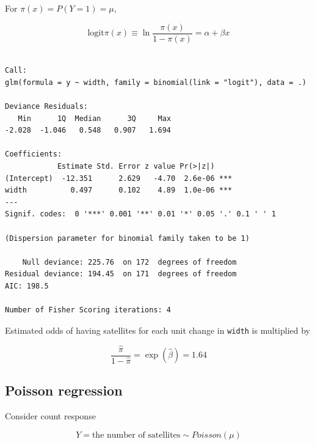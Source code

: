 \documentclass[]{book}
\newenvironment{Shaded}{\begin{snugshade}}{\end{snugshade}}
\newcommand{\DataTypeTok}[1]{\textcolor[rgb]{0.13,0.29,0.53}{#1}}
\newcommand{\KeywordTok}[1]{\textcolor[rgb]{0.13,0.29,0.53}{\textbf{#1}}}
\newcommand{\NormalTok}[1]{#1}
\newcommand{\OperatorTok}[1]{\textcolor[rgb]{0.81,0.36,0.00}{\textbf{#1}}}
\newcommand{\StringTok}[1]{\textcolor[rgb]{0.31,0.60,0.02}{#1}}
\begin{document}
For \(\pi(x) = P(Y = 1) = \mu\),

\[\text{logit}\pi(x) \equiv \ln\frac{\pi(x)}{1 - \pi(x)} = \alpha + \beta x\]

\begin{Shaded}
\end{Shaded}

\begin{verbatim}

Call:
glm(formula = y ~ width, family = binomial(link = "logit"), data = .)

Deviance Residuals: 
   Min      1Q  Median      3Q     Max  
-2.028  -1.046   0.548   0.907   1.694  

Coefficients:
            Estimate Std. Error z value Pr(>|z|)    
(Intercept)  -12.351      2.629   -4.70  2.6e-06 ***
width          0.497      0.102    4.89  1.0e-06 ***
---
Signif. codes:  0 '***' 0.001 '**' 0.01 '*' 0.05 '.' 0.1 ' ' 1

(Dispersion parameter for binomial family taken to be 1)

    Null deviance: 225.76  on 172  degrees of freedom
Residual deviance: 194.45  on 171  degrees of freedom
AIC: 198.5

Number of Fisher Scoring iterations: 4
\end{verbatim}

Estimated odds of having satellites for each unit change in \texttt{width} is multiplied by

\[\frac{\hat\pi}{1 - \hat\pi} = \exp(\hat\beta) = 1.64\]

\hypertarget{poisson-regression}{%
\subsection{Poisson regression}\label{poisson-regression}}

Consider count response

\[Y = \text{the number of satellites} \sim Poisson(\mu)\]

\begin{Shaded}
\end{Shaded}
\end{document}
